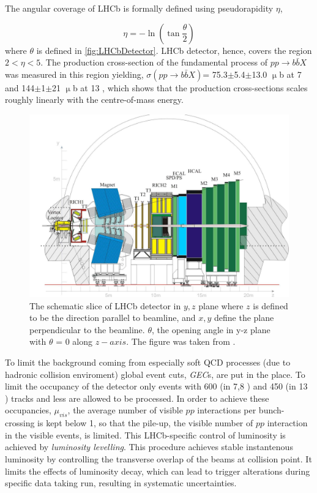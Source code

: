 The angular coverage of LHCb is formally defined using pseudorapidity $\eta$, 

\begin{equation}
	\eta = -\ln (\tan\frac{\theta}{2})
\end{equation}	
where $\theta$ is defined in \autoref{fig:LHCbDetector}. \Gls{LHCb} detector, hence, covers the region $2<\eta<5$. The production cross-section of the fundamental process of $pp\rightarrow b\bar{b}X$ was measured in this region yielding, $\sigma (pp\rightarrow b\bar{b}X)$= 75.3$\pm$5.4$\pm$13.0 $\upmu$b at 7 \tev \cite{LHCb-PAPER-2010-002} and 144$\pm$1$\pm$21 $\upmu$b at 13 \tev \cite{LHCb-PAPER-2016-031}, which shows that the production cross-sections scales roughly linearly with the centre-of-mass energy.

\begin{figure}
	\centering
	\includegraphics[scale = 0.15]{figs/detector/lhcbdet.pdf}
	\caption{The schematic slice of LHCb detector in $y,z$ plane where $z$ is defined to be the direction parallel to beamline, and $x,y$ define the plane perpendicular to the beamline. $\theta$, the opening angle in y-z plane with $\theta$ = 0 along $z-axis$. The figure was taken from \cite{LHCbdetector}.}
	\label{fig:LHCbDetector}
\end{figure}


To limit the background coming from especially soft QCD processes (due to hadronic collision enviroment) global event cuts, \textit{GEC}s, are put in the place. To limit the occupancy of the detector only events with 600 (in 7,8 \tev) and 450 (in 13 \tev) tracks and less are allowed to be processed. In order to achieve these occupancies, $\mu_{vis}$, the average number of visible $pp$ interactions per bunch-crossing is kept below 1, so that the pile-up, the visible number of $pp$ interaction in the visible events, is limited. This LHCb-specific control of luminosity is achieved by \textit{luminosity levelling}. This procedure achieves stable instantenous luminosity by controlling the transverse overlap of the beams at collision point. It limits the effects of luminosity decay, which can lead to trigger alterations during specific data taking run, resulting in systematic uncertainties.

